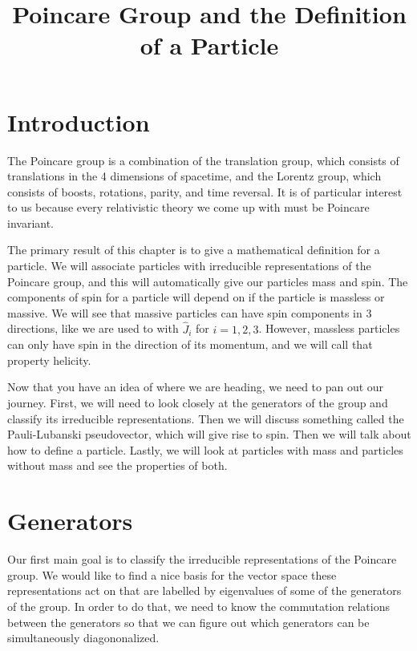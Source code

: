 \documentclass[12pt]{article}
\newcommand{\aside}[2]{#1}
\begin{document}
\title{Poincare Group and the Definition of a Particle}
\author{}
\date{}

\maketitle

\section{Introduction}
The Poincare group is a combination of the translation group, which consists of translations in the 4 dimensions of spacetime, and the Lorentz group, which consists of boosts, rotations, parity, and time reversal. It is of particular interest to us because \aside{every relativistic theory we come up with must be Poincare invariant}{Ignoring general relativity, in which Poincare invariance is only local.}.

The primary result of this chapter is to give a mathematical definition for a particle. We will associate particles with irreducible representations of the Poincare group, and this will automatically give our particles mass and spin. The components of spin for a particle will depend on if the particle is massless or massive. We will see that massive particles can have spin components in 3 directions, like we are used to with $\hat{J}_i$ for $i=1,2,3$. However, massless particles can only have spin in the direction of its momentum, and we will call that property helicity.

Now that you have an idea of where we are heading, we need to pan out our journey. First, we will need to look closely at the generators of the group and classify its irreducible representations. Then we will discuss something called the Pauli-Lubanski pseudovector, which will give rise to spin. Then we will talk about how to define a particle. Lastly, we will look at particles with mass and particles without mass and see the properties of both.

\section{Generators}
Our first main goal is to classify the irreducible representations of the Poincare group. We would like to find a nice basis for the vector space these representations act on that are labelled by eigenvalues of some of the generators of the group. In order to do that, we need to know the commutation relations between the generators so that we can figure out which generators can be simultaneously diagononalized.
\end{document}
